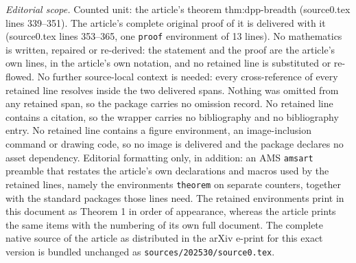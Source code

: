 \documentclass[10pt,a4paper]{amsart}
\begin{document}
\noindent\textit{Editorial scope.} Counted unit: the article's theorem thm:dpp-breadth (source0.tex lines 339--351). The article's complete original proof of it is delivered with it (source0.tex lines 353--365, one \texttt{proof} environment of 13 lines). No mathematics is written, repaired or re-derived: the statement and the proof are the article's own lines, in the article's own notation, and no retained line is substituted or re-flowed.  No further source-local context is needed: every cross-reference of every retained line resolves inside the two delivered spans.  Nothing was omitted from any retained span, so the package carries no omission record.  No retained line contains a citation, so the wrapper carries no bibliography and no bibliography entry.  No retained line contains a figure environment, an image-inclusion command or drawing code, so no image is delivered and the package declares no asset dependency.  Editorial formatting only, in addition: an AMS \texttt{amsart} preamble that restates the article's own declarations and macros used by the retained lines, namely the environments \texttt{theorem} on separate counters, together with the standard packages those lines need.  The retained environments print in this document as Theorem 1 in order of appearance, whereas the article prints the same items with the numbering of its own full document.  The complete native source of the article as distributed in the arXiv e-print for this exact version is bundled unchanged as \texttt{sources/202530/source0.tex}.
\end{document}

